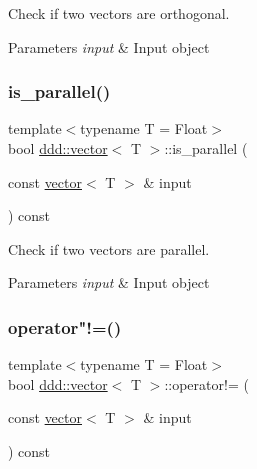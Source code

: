 Check if two vectors are orthogonal. 


\begin{DoxyParams}{Parameters}
{\em input} & Input object \\
\hline
\end{DoxyParams}
\mbox{\label{classddd_1_1vector_ac3fc063a06940c9893579b1f53f1dda0}} 
\subsubsection{\texorpdfstring{is\+\_\+parallel()}{is\_parallel()}}
{\footnotesize\ttfamily template$<$typename T = Float$>$ \\
bool \hyperlink{classddd_1_1vector}{ddd\+::vector}$<$ T $>$\+::is\+\_\+parallel (\begin{DoxyParamCaption}\item[{const \hyperlink{classddd_1_1vector}{vector}$<$ T $>$ \&}]{input }\end{DoxyParamCaption}) const\hspace{0.3cm}{\ttfamily [inline]}}



Check if two vectors are parallel. 


\begin{DoxyParams}{Parameters}
{\em input} & Input object \\
\hline
\end{DoxyParams}
\mbox{\label{classddd_1_1vector_a8c18336941576daaff53568d424a27bd}} 
\subsubsection{\texorpdfstring{operator"!=()}{operator!=()}}
{\footnotesize\ttfamily template$<$typename T = Float$>$ \\
bool \hyperlink{classddd_1_1vector}{ddd\+::vector}$<$ T $>$\+::operator!= (\begin{DoxyParamCaption}\item[{const \hyperlink{classddd_1_1vector}{vector}$<$ T $>$ \&}]{input }\end{DoxyParamCaption}) const\hspace{0.3cm}{\ttfamily [inline]}}



